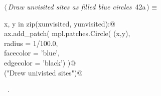 \documentclass[11.5pt]{report}
\begin{document}
\begin{flushleft} \small\label{scrap57}\raggedright\small
{} $\langle\,${\itshape Draw unvisited sites as filled blue circles}\nobreak\ {\footnotesize {42a}}$\,\rangle\equiv$
\vspace{-1ex}
\begin{list}{}{} \item
\mbox{}\verb@for x, y in zip(xunvisited, yunvisited):@\\
\mbox{}\verb@     ax.add_patch( mpl.patches.Circle( (x,y),\@\\
\mbox{}\verb@                                    radius    = 1/100.0,\@\\
\mbox{}\verb@                                    facecolor = 'blue',\@\\
\mbox{}\verb@                                    edgecolor = 'black')  )@\\
\mbox{}\verb@debug("Drew univisted sites")@\\
\mbox{}\verb@@{\NWsep}
\end{list}
\vspace{-1.5ex}
\footnotesize
\begin{list}{}{\setlength{\itemsep}{-\parsep}\setlength{\itemindent}{-\leftmargin}}
\item \NWtxtMacroRefIn\ .

\item{}
\end{list}
\vspace{4ex}
\end{flushleft}


\vspace{-0.8cm}\newchunk 
\end{document}
